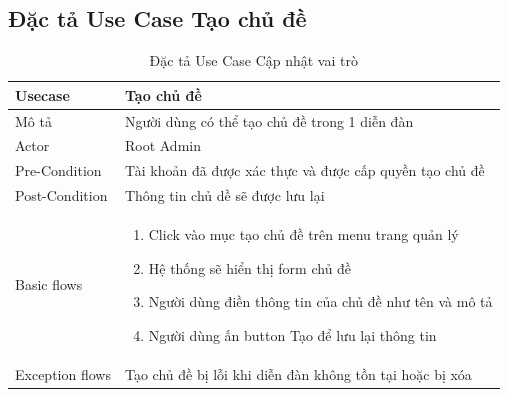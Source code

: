 \documentclass[../index.tex]{subfiles}
\begin{document}
    \subsection{Đặc tả Use Case Tạo chủ đề}
    \begin{table}[H]
        \centering
        {}
        \begin{tabular}{ |p{3cm}|p{9cm}| }
            \hline
            Usecase         & Tạo chủ đề                                                                                                                                                                                            \\
            \hline
            Mô tả           & Người dùng có thể tạo chủ đề trong 1 diễn đàn                                                                                                                  \\
            \hline
            Actor           & Root Admin                                                                                                                                                                                                    \\
            \hline
            Pre-Condition   & Tài khoản đã được xác thực và được cấp quyền tạo chủ đề                                                                                                                                                      \\
            \hline
            Post-Condition  & Thông tin chủ dề sẽ được lưu lại                                                                                                                                                                             \\
            \hline
            Basic flows     & \begin{enumerate}\item Click vào mục tạo chủ đề trên menu trang quản lý

\item Hệ thống sẽ hiển thị form chủ đề
\item Người dùng điền thông tin của chủ đề như tên và mô tả

\item Người dùng ấn button Tạo để lưu lại thông tin
\end{enumerate} \\
            \hline
            Exception flows & Tạo chủ đề bị lỗi khi diễn đàn không tồn tại hoặc bị xóa                                                                                                                                                              \\
            \hline
        \end{tabular}
        \caption{Đặc tả Use Case Cập nhật vai trò}
    \end{table}
\end{document}
